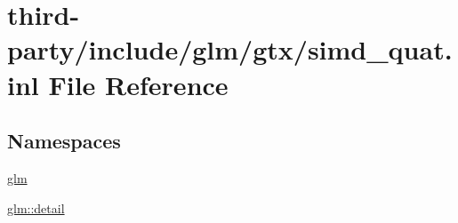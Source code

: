 \hypertarget{simd__quat_8inl}{}\section{third-\/party/include/glm/gtx/simd\+\_\+quat.inl File Reference}
\label{simd__quat_8inl}
\subsection*{Namespaces}
\begin{DoxyCompactItemize}
\item 
 \hyperlink{namespaceglm}{glm}
\item 
 \hyperlink{namespaceglm_1_1detail}{glm\+::detail}
\end{DoxyCompactItemize}
